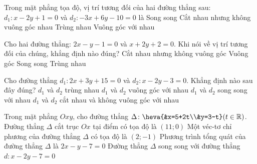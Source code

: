 \begin{ex}%
	Trong mặt phẳng tọa độ, vị trí tương đối của hai đường thẳng sau: $d_1\colon x-2y+1=0$ và $d_2\colon -3x+6y-10=0$ là
	\choice
		{\True Song song}
		{Cắt nhau nhưng không vuông góc nhau}
		{Trùng nhau}
		{Vuông góc với nhau}
\end{ex}

\begin{ex}%
	Cho hai đường thẳng: $2x-y-1=0$ và $x+2y+2=0$. Khi nói về vị trí tương đối của chúng, khẳng định nào đúng?
	\choice
		{Cắt nhau nhưng không vuông góc}
		{\True Vuông góc}
		{Song song} 
		{Trùng nhau}
\end{ex}

\begin{ex}%
	Cho đường thẳng $d_1\colon 2x+3y+15=0$ và $d_2\colon x-2y-3=0$. Khẳng định nào sau đây đúng? 
	\choice
		{$d_1$ và $d_2$ trùng nhau}
		{$d_1$ và $d_2$ vuông góc với nhau}
		{$d_1$ và $d_2$ song song với nhau}
		{\True $d_1$ và $d_2$ cắt nhau và không vuông góc với nhau}
\end{ex}


\begin{ex}%
	Trong mặt phẳng $Oxy$, cho đường thẳng $\Delta \colon \heva{&x=5+2t\\&y=3-t} (t \in  \mathbb{R})$.
	\choiceTF 
		{\True Đường thẳng  $\Delta$ cắt trục $Ox$ tại điểm có tọa độ là $(11;0)$}
		{\True Một véc-tơ chỉ phương của đường thẳng $\Delta$ có tọa độ là  $(2;-1)$}
		{Phương trình tổng quát của đường thẳng $\Delta$ là $2x-y-7=0$} 
		{Đường thẳng $\Delta$  song song với đường thẳng $d\colon x-2y-7=0$}
\end{ex}

